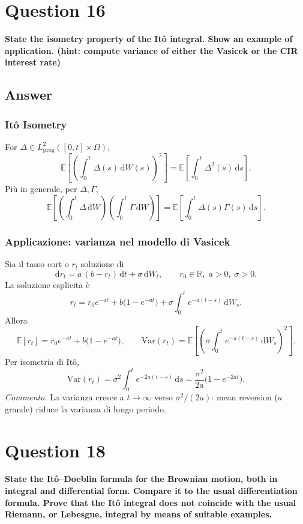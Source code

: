 \documentclass[12pt,a4paper]{book}
\theoremstyle{remark}
\newcommand{\EE}{\mathbb{E}}          %
\newcommand{\RR}{\mathbb{R}}
\newcommand{\Var}{\mathrm{Var}}       %
\newcommand{\dd}{\mathrm{d}}
\begin{document}
\newpage
\section{Question 16}
\textbf{State the isometry property of the It\^o integral. Show an example of application. (hint: compute variance of either the Vasicek or the CIR interest rate)}

\subsection*{Answer}

\subsubsection*{It\^o Isometry}
For $\Delta \in L^2_{\text{prog}}([0,t]\times\Omega)$,
\[
\boxed{\;\EE\!\left[\left(\int_0^t \Delta(s)\,\dd W(s)\right)^{\!2}\right]
= \EE\!\left[\int_0^t \Delta^2(s)\,\dd s\right].\;}
\]
Pi\`u in generale, per $\Delta,\Gamma$,
\[
\EE\!\left[\!\left(\int_0^t \Delta\,\dd W\right)\!\!\left(\int_0^t \Gamma\,\dd W\right)\!\right]
= \EE\!\left[\int_0^t \Delta(s)\Gamma(s)\,\dd s\right].
\]

\subsubsection*{Applicazione: varianza nel modello di Vasicek}
Sia il tasso cort o $r_t$ soluzione di
\[
\dd r_t = a\,(b-r_t)\,\dd t + \sigma\,\dd W_t,\qquad r_0 \in\RR,\; a>0,\; \sigma>0.
\]
La soluzione esplicita \`e
\[
r_t = r_0 e^{-at} + b\big(1-e^{-at}\big) + \sigma \int_0^t e^{-a(t-s)}\,\dd W_s.
\]
Allora
\[
\EE[r_t] = r_0 e^{-at} + b\big(1-e^{-at}\big),
\qquad
\Var(r_t) = \EE\!\left[\left(\sigma \int_0^t e^{-a(t-s)}\,\dd W_s\right)^{\!2}\right].
\]
Per isometria di It\^o,
\[
\Var(r_t) = \sigma^2 \int_0^t e^{-2a(t-s)}\,\dd s
= \frac{\sigma^2}{2a}\Big(1-e^{-2at}\Big).
\]
\textit{Commento.} La varianza cresce a $t\!\to\!\infty$ verso $\sigma^2/(2a)$: mean reversion ($a$ grande) riduce la varianza di lungo periodo.


\newpage
\section{Question 18}
\textbf{State the It\^o--Doeblin formula for the Brownian motion, both in integral and differential form. Compare it to the usual differentiation formula. Prove that the It\^o integral does not coincide with the usual Riemann, or Lebesgue, integral by means of suitable examples.}
\end{document}
